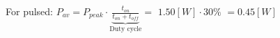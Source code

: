 \documentclass[preview]{standalone}
\begin{document}
\begin{center}
For pulsed: $P_{av} = P_{peak} \cdot $$\underbrace{\frac{t_{on}}{t_{on}+t_{off}}}_{\text{Duty cycle}}=$ $1.50 [W] \cdot $$30 \%$ $=$$0.45 [W]$
\end{center}
\end{document}
